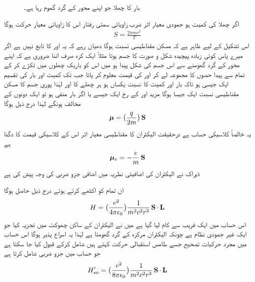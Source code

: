 \begin{figure}
\centering
{}
\caption{بار کا چھلا جو اپنے محور کے گرد گھوم رہا ہے۔}
\label{شکل_غیر_تابع_اضطراب_چھلا_بار}
\end{figure}

اگر چھلا کی کمیت  ہو جمودی معیار اثر  ضرب زاویائی سمتی رفتار  اس کا زاویائی معیار حرکت ہوگا 
\begin{align*} 
S = \frac{2 \pi mr^2}{T}
\end{align*}
اس  تشکیل   کے لیے ظاہر ہے کہ مسکن مقناطیسی نسبت  ہوگا دھیان رہے کہ یہ  اور  کا  تابع نہیں  ہے اگر میرے پاس کوئی زیادہ پیچیدہ شکل و صورت کا جسم ہوتا مثلاً  ایک  کرہ  صرف اتنا ضروری ہے کہ اپنے محور کے گرد گھومنے سے اس جسم کی شکل پیدا ہو میں اس کو باریک چھلوں میں ٹکڑے کر کے تمام  سے پیدا حصوں کا مجموعہ لے کر  اور  کی قیمت معلوم کر پاتا جب تک کمیت اور بار کی تقسیم ایک جیسی ہو تاکہ بار اور کمیت کا نسبت یکساں ہو ہر  چھلے  کا اور لہٰذا   پوری جسم کا مسکن مقناطیسی نسبت ایک  جیسا ہوگا مزید  اور  کے رخ ایک  جیسے یا اگر بار منفی ہو تو ایک دونوں کے مخالف ہونگے لہٰذا   درج ذیل ہوگا 
\begin{align*}
{\ensuremath{{\boldsymbol{\mu}}}} = \big ( \frac{q}{2m} \big ) \operatorname{\mathbf{S}}
\end{align*}
یہ خالصاً  کلاسیکی حساب ہے درحقیقت الیکٹران کا مقناطیسی معیار اثر اس کے کلاسیکی قیمت کا دگنا ہے 
\begin{align}
{\ensuremath{{\boldsymbol{\mu}}}}_e = - \frac{e}{m} \operatorname{\mathbf{S}}
\end{align}
ڈیراک   نے الیکٹران کی اضافیتی نظریہ میں اضافی جزو ضربی  کی وجہ پیش کی ہے

 ان تمام کو اکٹھے کرتے ہوئے درج ذیل حاصل ہوگا 
\begin{align*}
H = \big ( \frac{e^2}{4 \pi \epsilon_0} \big ) \frac{1}{m^2 c^2 r^3} \operatorname{\mathbf{S}} \cdot \operatorname{\mathbf{L}}
\end{align*}
اس حساب میں ایک  فریب سے کام لیا گیا ہے میں نے الیکٹران کے ساکن  چھوکٹ میں تجزیہ کیا جو ایک غیر جمودی نظام ہے چونکہ الیکٹران مرکزہ کے گرد گھومتا ہے لہٰذا   یہ اسراع  پذیر ہوگا اس حساب میں مجرد حرکیات تصحیح جسے طامس استقبالی حرکت کہتے ہیں شامل کرکے قبول کیا جا سکتا ہے جو حساب میں جزو ضربی  شامل کرتا ہے 
\begin{align}
H'_{so} = \big ( \frac{e^2}{8 \pi \epsilon_0} \big ) \frac{1}{m^2 c^2 r^3} \operatorname{\mathbf{S}} \cdot \operatorname{\mathbf{L}}
\end{align}


